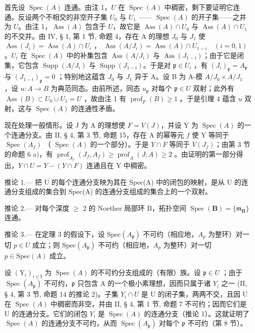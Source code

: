 首先设 \(\operatorname{Spec}(A)\) 连通。由注 1，\(U\) 在 \(\operatorname{Spec}(A)\) 中稠密，剩下要证明它连通。反设两个不相交的非空开子集 \(U_0\) 与 \(U_1\) —— \(\operatorname{Spec}(A)\) 的开子集——之并为 \(U\)。由注 1，\(\operatorname{Ass}(A)\) 包含于 \(U\)，故它是 \(\operatorname{Ass}(A) \cap U_0\) 与 \(\operatorname{Ass}(A) \cap U_1\) 的不交并。由 IV, § 1, 第 1 节, 命题 4，存在 A 的理想 \(J_0\) 与 \(J_1\) 使 \(\operatorname{Ass}(J_i) = \operatorname{Ass}(A) \cap U_i\) ， \(\operatorname{Ass}(A/J_i) = \operatorname{Ass}(A) \cap U_{1-i}\quad (i=0,1)\) 。\(U_i\) 在 \(\operatorname{Spec}(A)\) 中的补集包含 \(\operatorname{Ass}(A/J_i)\) 与 \(\operatorname{Ass}(J_{1-i})\)；由于它是闭集，它包含 \(\operatorname{Supp}(A/J_i)\) 与 \(\operatorname{Supp}(J_{1-i})\)。于是对 \(\mathfrak{p} \in U_i\) ，有 \((J_i)_{\mathfrak{p}} = A_{\mathfrak{p}}\) 与 \((J_{1-i})_{\mathfrak{p}} = 0\) ；特别地这蕴含 \(J_0\) 与 \(J_1\) 异于 A。设 B 为 A-模 \(A/J_0 \times A/J_1\) ，设 \(u: A \to B\) 为典范同态。由前所述，同态 \(u_{\mathfrak{p}}\) 对每个 \(\mathfrak{p} \in U\) 双射；此外有 \(\operatorname{Ass}(B) \subset U_0 \cup U_1 = U\) ，故由注 1 有 \(\operatorname{prof}_F(B) \geqslant 1\) 。于是引理 4 蕴含 \(u\) 双射，这与 \(\operatorname{Spec}(A)\) 的连通性矛盾。

现在处理一般情形。设 J 为 A 的理想使 \(F = V(J)\)，并设 Y 为 \(\operatorname{Spec}(A)\) 的一个连通分支。由 II, § 4, 第 3 节, 命题 15，存在 A 的幂等元 \(f\) 使 Y 等同于 \(\operatorname{Spec}(A_f)\) （ \(\operatorname{Spec}(A)\) 的一个部分）。于是 \(Y \cap F\) 等同于 \(V(J_f)\)；由第 3 节的命题 6 a)，有 \(\operatorname{prof}_{A_f}(J_f, A_f) \geqslant \operatorname{prof}_A(J; A) \geqslant 2\) 。由证明的第一部分得出，\(Y \cap U = Y - (Y \cap F)\) 连通且在 Y 中稠密。

推论 1.--- 把 U 的每个连通分支映为其在 Spec(A) 中的闭包的映射，是从 U 的连通分支组成的集合到 Spec(A) 的连通分支组成的集合上的一个双射。

推论 2.--- 对每个深度 \(\geqslant\) 2 的 Noether 局部环 B，拓扑空间 \(\operatorname{Spec}(\mathbf{B}) = \{\mathfrak{m}_{\mathbf{B}}\}\) 连通。

推论 3.--- 在定理 3 的假设下，设 \(\text{Spec}(A_{\mathfrak{p}})\) 不可约（相应地，\(A_{p}\) 为整环）对一切 \(p \in U\) 成立；则 \(\text{Spec}(A_{\mathfrak{p}})\) 不可约（相应地，\(A_{p}\) 为整环）对一切 \(p \in \text{Spec}(A)\) 成立。

设 \((\mathrm{Y}_{i})_{i\in\mathrm{I}}\) 为 \(\operatorname{Spec}(A)\) 的不可约分支组成的（有限）族。设 \(\mathfrak{p}\in U\) ；由于 \(\operatorname{Spec}(A_{\mathfrak{p}})\) 不可约，\(\mathfrak{p}\) 只包含 A 的一个极小素理想，因而只属于诸 \(Y_i\) 之一 (II, § 4, 第 3 节, 命题 14 的推论 2)。子集 \(Y_i\cap U\) 是 U 的闭子集，两两不交，且因 U 在 \(\operatorname{Spec}(A)\) 中稠密而非空，并由 II, § 4, 第 1 节, 命题 7 不可约；因而它们是 U 的连通分支。它们的闭包 \(Y_i\) 是 \(\operatorname{Spec}(A)\) 的连通分支（推论 1）。这就证明了 \(\operatorname{Spec}(A)\) 的连通分支不可约，从而 \(\operatorname{Spec}(A_{\mathfrak{p}})\) 对每个 \(\mathfrak{p}\) 不可约（第 8 节）。

